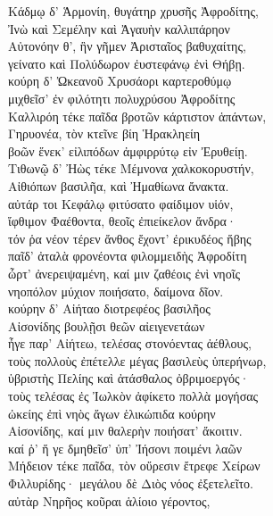 \begin{pages}
\begin{Leftside}
\quad{}Κάδμῳ δ' Ἁρμονίη, θυγάτηρ χρυσῆς Ἀφροδίτης, \\
Ἰνὼ καὶ Σεμέλην καὶ Ἀγαυὴν καλλιπάρηον \\
Αὐτονόην θ', ἣν γῆμεν Ἀρισταῖος βαθυχαίτης,\\
γείνατο καὶ Πολύδωρον ἐυστεφάνῳ ἐνὶ Θήβῃ.\\
κούρη δ' Ὠκεανοῦ Χρυσάορι καρτεροθύμῳ\\

\quad{}μιχθεῖσ' ἐν φιλότητι πολυχρύσου Ἀφροδίτης \\
Καλλιρόη τέκε παῖδα βροτῶν κάρτιστον ἁπάντων,\\
Γηρυονέα, τὸν κτεῖνε βίη Ἡρακληείη\\
βοῶν ἕνεκ' εἰλιπόδων ἀμφιρρύτῳ εἰν Ἐρυθείῃ.\\
Τιθωνῷ δ' Ἠὼς τέκε Μέμνονα χαλκοκορυστήν,\\

\quad{}Αἰθιόπων βασιλῆα, καὶ Ἠμαθίωνα ἄνακτα. \\
αὐτάρ τοι Κεφάλῳ φιτύσατο φαίδιμον υἱόν, \\
ἴφθιμον Φαέθοντα, θεοῖς ἐπιείκελον ἄνδρα· \\
τόν ῥα νέον τέρεν ἄνθος ἔχοντ' ἐρικυδέος ἥβης\\
παῖδ' ἀταλὰ φρονέοντα φιλομμειδὴς Ἀφροδίτη\\
ὦρτ' ἀνερειψαμένη, καί μιν ζαθέοις ἐνὶ νηοῖς  \\
νηοπόλον μύχιον ποιήσατο, δαίμονα δῖον. \\
κούρην δ' Αἰήταο διοτρεφέος βασιλῆος\\

\quad{}Αἰσονίδης βουλῇσι θεῶν αἰειγενετάων\\
ἦγε παρ' Αἰήτεω, τελέσας στονόεντας ἀέθλους,\\
τοὺς πολλοὺς ἐπέτελλε μέγας βασιλεὺς ὑπερήνωρ, \\
ὑβριστὴς Πελίης καὶ ἀτάσθαλος ὀβριμοεργός· \\
τοὺς τελέσας ἐς Ἰωλκὸν ἀφίκετο πολλὰ μογήσας\\
ὠκείης ἐπὶ νηὸς ἄγων ἑλικώπιδα κούρην\\
Αἰσονίδης, καί μιν θαλερὴν ποιήσατ' ἄκοιτιν.\\
καί ῥ' ἥ γε δμηθεῖσ' ὑπ' Ἰήσονι ποιμένι λαῶν  \\
Μήδειον τέκε παῖδα, τὸν οὔρεσιν ἔτρεφε Χείρων\\
Φιλλυρίδης· μεγάλου δὲ Διὸς νόος ἐξετελεῖτο. \\
αὐτὰρ Νηρῆος κοῦραι ἁλίοιο γέροντος,\\


\end{Leftside}
\end{pages}
